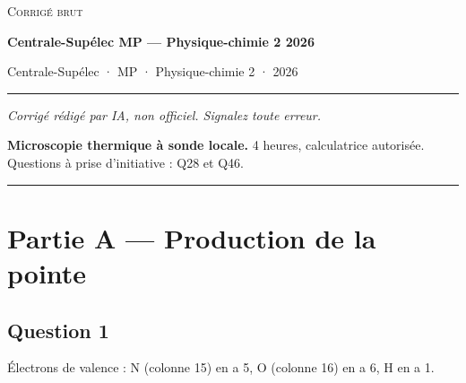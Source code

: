 \documentclass[11pt,a4paper]{article}
\begin{document}
\thispagestyle{plain}
\begin{center}
  {\small\scshape Corrigé brut}\par\smallskip
  {\LARGE\bfseries Centrale-Supélec MP — Physique-chimie 2 2026\par}\medskip
  {\large Centrale-Supélec · MP · Physique-chimie 2 · 2026\par}
\end{center}
\vspace{2pt}\hrule\vspace{8pt}

\emph{Corrigé rédigé par IA, non officiel. Signalez toute erreur.}

\textbf{Microscopie thermique à sonde locale.} 4 heures, calculatrice autorisée. Questions à prise d'initiative : Q28 et Q46.

\begin{center}\rule{0.5\linewidth}{0.5pt}\end{center}

\hypertarget{partie-a-production-de-la-pointe}{%
\section{Partie A --- Production de la pointe}\label{partie-a-production-de-la-pointe}}

\hypertarget{question-1}{%
\subsection{Question 1}\label{question-1}}

Électrons de valence : N (colonne 15) en a 5, O (colonne 16) en a 6, H en a 1.
\end{document}
